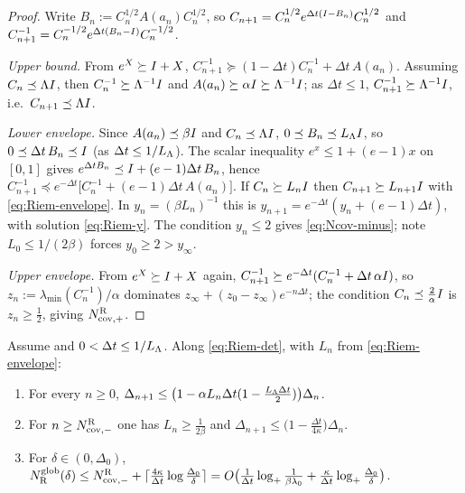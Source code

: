 \begin{proof}
Write $B_n:=C_n^{1/2}A(a_n)C_n^{1/2}$, so $C_{n+1}=C_n^{1/2}e^{\Delta t(I-B_n)}C_n^{1/2}$ and
$C_{n+1}^{-1}=C_n^{-1/2}e^{\Delta t(B_n-I)}C_n^{-1/2}$.

\emph{Upper bound.} From $e^X\succeq I+X$,
$C_{n+1}^{-1}\succeq(1-\Delta t)C_n^{-1}+\Delta t\,A(a_n)$. Assuming $C_n\preceq\Lambda I$, then
$C_n^{-1}\succeq\Lambda^{-1}I$ and $A(a_n)\succeq\alpha I\succeq\Lambda^{-1}I$; as $\Delta t\leq1$,
$C_{n+1}^{-1}\succeq\Lambda^{-1}I$, i.e.\ $C_{n+1}\preceq\Lambda I$.

\emph{Lower envelope.} Since $A(a_n)\preceq\beta I$ and $C_n\preceq\Lambda I$,
$0\preceq B_n\preceq L_\Lambda I$, so $0\preceq\Delta t\,B_n\preceq I$ (as $\Delta t\leq1/L_\Lambda$). The
scalar inequality $e^x\leq1+(e-1)x$ on $[0,1]$ gives
$e^{\Delta tB_n}\preceq I+(e-1)\Delta t\,B_n$, hence
$C_{n+1}^{-1}\preceq e^{-\Delta t}\bigl[C_n^{-1}+(e-1)\Delta t\,A(a_n)\bigr]$. If $C_n\succeq L_nI$
then $C_{n+1}\succeq L_{n+1}I$ with \eqref{eq:Riem-envelope}. In $y_n=(\beta L_n)^{-1}$ this is
$y_{n+1}=e^{-\Delta t}(y_n+(e-1)\Delta t)$, with solution \eqref{eq:Riem-y}. The condition
$y_n\leq2$ gives \eqref{eq:Ncov-minus}; note $L_0\leq1/(2\beta)$ forces $y_0\geq2>y_\infty$.

\emph{Upper envelope.} From $e^X\succeq I+X$ again,
$C_{n+1}^{-1}\succeq e^{-\Delta t}(C_n^{-1}+\Delta t\,\alpha I)$, so
$z_n:=\lambda_{\min}(C_n^{-1})/\alpha$ dominates $z_\infty+(z_0-z_\infty)e^{-n\Delta t}$; the
condition $C_n\preceq\tfrac2\alpha I$ is $z_n\geq\tfrac12$, giving $N_{\mathrm{cov},+}^{\mathrm{R}}$.
\end{proof}

\begin{theorem}
\label{thm:Riem-global}
Assume  and $0<\Delta t\leq1/L_\Lambda$. Along \eqref{eq:Riem-det}, with
$L_n$ from \eqref{eq:Riem-envelope}:
\begin{enumerate}
\item For every $n\geq0$,
$\Delta_{n+1}\leq\bigl(1-\alpha L_n\Delta t(1-\tfrac{L_\Lambda\Delta t}2)\bigr)\Delta_n$.
\item For $n\geq N_{\mathrm{cov},-}^{\mathrm{R}}$ one has $L_n\geq\tfrac1{2\beta}$ and
$\Delta_{n+1}\leq\bigl(1-\tfrac{\Delta t}{4\kappa}\bigr)\Delta_n$.
\item For $\delta\in(0,\Delta_0)$,
$N_{\mathrm{R}}^{\mathrm{glob}}(\delta)\leq N_{\mathrm{cov},-}^{\mathrm{R}}+\lceil\tfrac{4\kappa}{\Delta t}\log\tfrac{\Delta_0}\delta\rceil
=O\bigl(\tfrac1{\Delta t}\log_+\tfrac1{\beta\lambda_0}+\tfrac\kappa{\Delta t}\log_+\tfrac{\Delta_0}\delta\bigr)$.
\end{enumerate}
\end{theorem}

